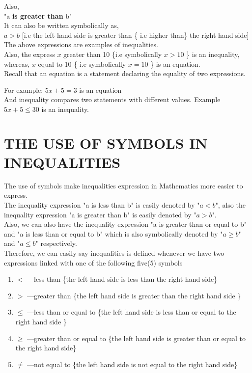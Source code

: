 \documentclass[12pt]{report}
\newcommand{\bt}[1]{\textbf{#1}}
\newcommand{\spn}[1]{\\[#1cm]}
\newcommand{\NI}{\noindent}
\begin{document}
	\NI Also,\\
	"a \bt{is greater than } b"\\
	It can also be written symbolically as,\\
	$\displaystyle a > b$ [i.e the left hand side is greater than \{ i.e higher than\} the right hand side]\spn{-0.3}
	
	\NI The above expressions are examples of inequalities.\\
	
	\NI Also, the express $x$ greater than 10 \{i.e symbolically $x > 10$ \} is an inequality, whereas, $x$ equal to 10 \{ i.e symbolically $x = 10$ \} is an equation.\\
	
	\NI Recall that an equation is a statement declaring the equality of two expressions.
	
	\NI For example; $5x + 5 = 3$ is an equation\spn{-.5}
	
	\NI And inequality compares two statements with different values. Example $5x + 5 \leq 30$ is an inequality.
	
	\section{THE USE OF SYMBOLS IN INEQUALITIES}
	
	The use of symbols make inequalities expression in Mathematics more easier to express.\spn{-.3}
	
	\NI The inequality expression "a is less than b" is easily denoted by "$a < b$", also the inequality expression "a is greater than b" is easily denoted by "$a > b$".\spn{-.4}
	
	\NI Also, we can also have the inequality expression "a is greater than or equal to b" and "a is less than or equal to b" which is also symbolically denoted by "$a \geq b$" and "$a \leq b$" respectively.\spn{-.3}
	
	\NI Therefore, we can easily say inequalities is defined whenever we have two expressions linked with one of the following five(5) symbols
	\begin{enumerate}
		\item $<$ \quad ---\quad less than \{the left hand side is less than the right hand side\}
		
		\item $>$ \quad ---\quad greater than \{the left hand side is greater than the right hand side \}
		
		\item $\leq$ \quad ---\quad less than or equal to \{the left hand side is less than or equal to the right hand side \}
		
		\item $\geq$ \quad ---\quad greater than or equal to \{the left hand side is greater than or equal to the right hand side\}
		
		\item $\neq$ \quad ---\quad not equal to \{the left hand side is not equal to the right hand side\}
	\end{enumerate}
\end{document}
